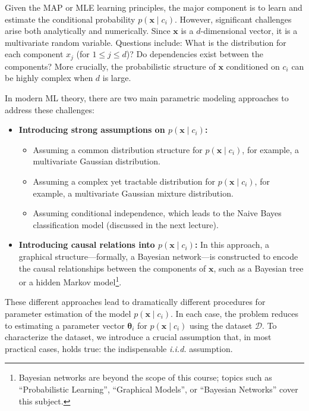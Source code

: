 \documentclass[12pt]{article}
\begin{document}
Given the MAP or MLE learning principles, the major component is to learn and estimate the conditional probability \(p(\bm{x} \mid c_i)\). However, significant challenges arise both analytically and numerically. Since \(\bm{x}\) is a \(d\)-dimensional vector, it is a multivariate random variable. Questions include: What is the distribution for each component \(x_j\) (for \(1 \leq j \leq d\))? Do dependencies exist between the components? More crucially, the probabilistic structure of \(\bm{x}\) conditioned on \(c_i\) can be highly complex when \(d\) is large.

In modern ML theory, there are two main parametric modeling approaches to address these challenges:
\begin{itemize}
    \item \textbf{Introducing strong assumptions on \(p(\bm{x} \mid c_i)\):}
    \begin{itemize}
        \item Assuming a common distribution structure for \(p(\bm{x} \mid c_i)\), for example, a multivariate Gaussian distribution.
        \item Assuming a complex yet tractable distribution for \(p(\bm{x} \mid c_i)\), for example, a multivariate Gaussian mixture distribution.
        \item Assuming conditional independence, which leads to the Naive Bayes classification model (discussed in the next lecture).
    \end{itemize}
    \item \textbf{Introducing causal relations into \(p(\bm{x} \mid c_i)\):} In this approach, a graphical structure—formally, a Bayesian network—is constructed to encode the causal relationships between the components of \(\bm{x}\), such as a Bayesian tree or a hidden Markov model\footnote{Bayesian networks are beyond the scope of this course; topics such as ``Probabilistic Learning'', ``Graphical Models'', or ``Bayesian Networks'' cover this subject.}.
\end{itemize}

These different approaches lead to dramatically different procedures for parameter estimation of the model \(p(\bm{x} \mid c_i)\). In each case, the problem reduces to estimating a parameter vector \(\pmb{\theta}_i\) for \(p(\bm{x} \mid c_i)\) using the dataset \(\mathcal{D}\). To characterize the dataset, we introduce a crucial assumption that, in most practical cases, holds true: the indispensable \textit{i.i.d.} assumption.
\end{document}
